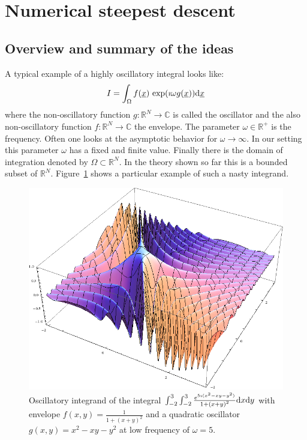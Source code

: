 \documentclass[a4paper,10pt]{article}
\begin{document}
\section{Numerical steepest descent}

\subsection{Overview and summary of the ideas}


A typical example of a highly oscillatory integral looks like:
\begin{equation}
  I = \int_{\Omega} f(\underline{x}) \, \exp(\imath \omega g(\underline{x})) \mathrm{d}\underline{x}
\end{equation}
where the non-oscillatory function $g:\mathbb{R}^N \rightarrow \mathbb{C}$
is called the oscillator and the also non-oscillatory function
$f:\mathbb{R}^N \rightarrow \mathbb{C}$ the envelope. The parameter
$\omega \in \mathbb{R}^{+}$ is the frequency. Often one looks at the
asymptotic behavior for $\omega \rightarrow \infty$. In our setting
this parameter $\omega$ has a fixed and finite value.
Finally there is the domain of integration denoted by $\Omega \subset \mathbb{R}^N$.
In the theory shown so far this is a bounded subset of $\mathbb{R}^N$.
Figure~\ref{fig:oscillatory_example_2d} shows a particular
example of such a nasty integrand.

\begin{figure}[h]
  \centering
  \includegraphics[width=0.6\linewidth]{fig/oscillatory_example_2d.png}
  \caption{Oscillatory integrand of the integral
  $\int_{-2}^3 \int_{-2}^3 \frac{e^{5 \imath (x^2-x y-y^2)}}{1 + {(x+y)}^2} \mathrm{d}x \mathrm{d}y  $
  with envelope $f(x,y) = \frac{1}{1 + {(x+y)}^2}$ and a quadratic oscillator
  $g(x,y) = x^2 - x y - y^2$ at low frequency of $\omega = 5$.}
  \label{fig:oscillatory_example_2d}
\end{figure}
\end{document}
